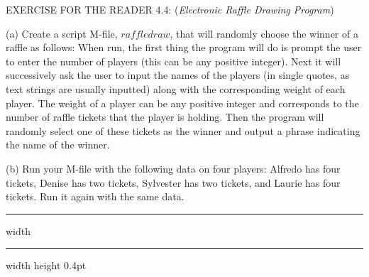 \documentclass[../main.tex]{subfiles}
\begin{document}
EXERCISE FOR THE READER 4.4: (\emph{Electronic Raffle Drawing Program})

(a) Create a script M-file, $raffledraw$, that will randomly choose the winner of a raffle as follows: When run, the first thing the program will do is prompt the user to enter the number of players (this can be any positive integer). Next it will successively ask the user to input the names of the players (in single quotes, as text strings are usually inputted) along with the corresponding weight of each player. The weight of a player can be any positive integer and corresponds to the number of raffle tickets that the player is holding. Then the program will randomly select one of these tickets as the winner and output a phrase indicating the name of the winner.

(b) Run your M-file with the following data on four players: Alfredo has four tickets, Denise has two tickets, Sylvester has two tickets, and Laurie has four tickets. Run it again with the same data.\\

\hrule width \hsize \kern 1pt \hrule width \hsize height 0.4pt

\hspace{0.1cm}
\end{document}
